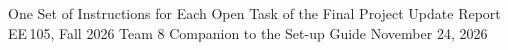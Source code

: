 \documentclass[11pt,letterpaper]{article}
\begin{document}
\thispagestyle{plain}
%
  {One Set of Instructions for Each Open Task of the Final Project Update Report}%
  {EE\,105, Fall 2026 \textperiodcentered{} Team 8 \textperiodcentered{} Companion to the Set-up Guide}%
  {November 24, 2026}


\tableofcontents
\clearpage
\setcounter{section}{-1}







\appendix

\end{document}
